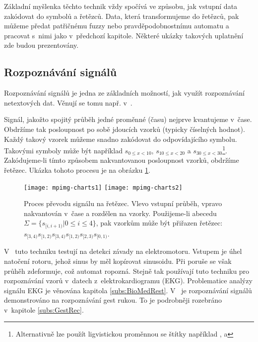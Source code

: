 Základní myšlenka těchto technik vždy spočívá ve způsobu, jak vstupní data zakódovat do symbolů a řetězců. Data, která transformujeme do řetězců, pak můžeme předat patřičnému fuzzy nebo pravděpodobnostnímu automatu a pracovat s~nimi jako v~předchozí kapitole. Některé ukázky takových uplatnění zde budou prezentovány. 

\subsection{Rozpoznávání signálů} \label{subs:RozpSign}
Rozpoznávání signálů je jedna ze základních možností, jak využít rozpoznávání netextových dat. Věnují se tomu např. v~\cite{MukRay-StaSplMerProbFiStaAuSigRepAna, Rig-FauDetIsoBasFuzzAut, BaiTri-PattRecUsiTemFuzzAut, KemAda-SeqPatRecEmpRecFuzSys}.

Signál, jakožto spojitý průběh jedné proměnné (času) nejprve kvantujeme v~čase. Obdržíme tak posloupnost po sobě jdoucích vzorků (typicky číselných hodnot). Každý takový vzorek můžeme snadno zakódovat do odpovídajícího symbolu. Takovými symboly může být například $s_{0 \leq x < 10}$, $s_{10 \leq x < 20}$ a $s_{30 \leq x < 30}$\footnote{Alternativně lze použít ligvistickou proměnnou se štítky například ,  a }. Zakódujeme-li tímto způsobem nakvantovanou posloupnost vzorků, obdržíme řetězec. Ukázka tohoto procesu je na obrázku \ref{img:SignRec}.

\begin{figure}
 \texttt{[image: mpimg-charts1]}
 \texttt{[image: mpimg-charts2]}
 
 \caption[Proces převodu signálu na řetězec]{Proces převodu signálu na řetězec. Vlevo vstupní průběh, vpravo nakvantován v~čase a rozdělen na vzorky. Použijeme-li abecedu $\Sigma = \{ s_{[i,i+1)} | 0 \le i \leq 4 \}$, pak vzorkům může být přiřazen řetězec: $s_{[3,4)} s_{[1,2)} s_{[3,4)} s_{[1,2)} s_{[2,3)} s_{[0,1)}$.} \label{img:SignRec}
\end{figure}




V~\cite{Rig-FauDetIsoBasFuzzAut} tuto techniku testují na detekci závady na elektromotoru. Vstupem je úhel natočení rotoru, jehož sinus by měl kopírovat sinusoidu. Při poruše se však průhěh zdeformuje, což automat ropozná. Stejně tak používají tuto techniku pro rozpoznávání vzorů v~datech z~elektrokardiogramu (EKG). Problematice analýzy signálu EKG je věnována kapitola \ref{subs:BioMedRest}. V~\cite{BaiTri-PattRecUsiTemFuzzAut} je rozpoznávání signálů demonstrováno na rozpoznávání gest rukou. To je podrobněji rozebráno v~kapitole \ref{subs:GestRec}.

